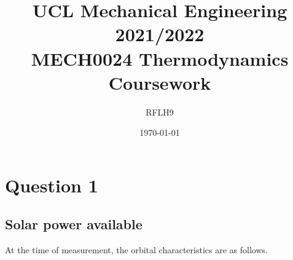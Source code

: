 \documentclass[11pt]{article}
\numberwithin{equation}{section}
\begin{document}
\title{\textbf{UCL Mechanical Engineering 2021/2022}\\MECH0024 Thermodynamics Coursework}
\author{RFLH9}
\date{\today}
\maketitle
\tableofcontents
\listoffigures
\listoftables
\newpage
\section{Question 1}
\subsection{Solar power available}
At the time of measurement, the orbital characteristics are as follows.
\end{document}
